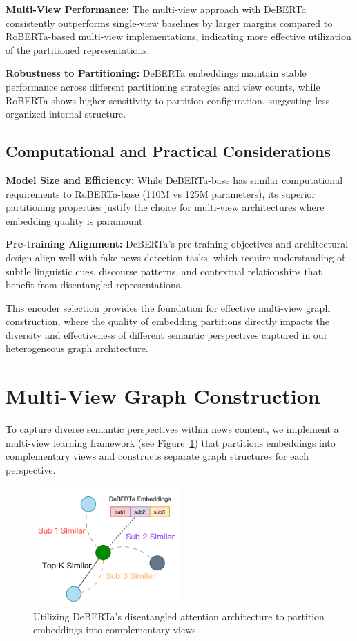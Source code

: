 \textbf{Multi-View Performance:} The multi-view approach with DeBERTa consistently outperforms single-view baselines by larger margins compared to RoBERTa-based multi-view implementations, indicating more effective utilization of the partitioned representations.

\textbf{Robustness to Partitioning:} DeBERTa embeddings maintain stable performance across different partitioning strategies and view counts, while RoBERTa shows higher sensitivity to partition configuration, suggesting less organized internal structure.

\subsection{Computational and Practical Considerations}

\textbf{Model Size and Efficiency:} While DeBERTa-base has similar computational requirements to RoBERTa-base (110M vs 125M parameters), its superior partitioning properties justify the choice for multi-view architectures where embedding quality is paramount.

\textbf{Pre-training Alignment:} DeBERTa's pre-training objectives and architectural design align well with fake news detection tasks, which require understanding of subtle linguistic cues, discourse patterns, and contextual relationships that benefit from disentangled representations.

This encoder selection provides the foundation for effective multi-view graph construction, where the quality of embedding partitions directly impacts the diversity and effectiveness of different semantic perspectives captured in our heterogeneous graph architecture.

\section{Multi-View Graph Construction}

To capture diverse semantic perspectives within news content, we implement a multi-view learning framework (see Figure~\ref{fig:multi_view}) that partitions embeddings into complementary views and constructs separate graph structures for each perspective.

\begin{figure}[h]
    \centering
    \includegraphics[width=0.5\textwidth]{context/methodology/fig/multi_view.png}
    \caption{Utilizing DeBERTa's disentangled attention architecture to partition embeddings into complementary views}
    \label{fig:multi_view}
\end{figure}

